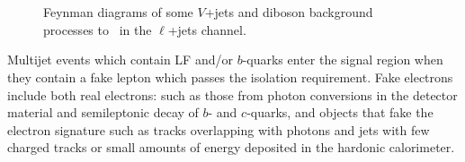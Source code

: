 \begin{figure}[htbp]
  \centering
    \begin{minipage}[][][t]{.32\textwidth}
      \centering
        
      \label{fig:WbbJets}
    \end{minipage}
    \,
    \begin{minipage}[][][t]{.32\textwidth}
      \centering
        
      \label{fig:ZbbJets}
    \end{minipage}
    
    \begin{minipage}[][][t]{.32\textwidth}
      \centering
        
      \label{fig:WW}
    \end{minipage}
    \,
    \begin{minipage}[][][t]{.32\textwidth}
      \centering
        
      \label{fig:SingleTop}
    \end{minipage}
    \caption{Feynman diagrams of some $V$+jets and diboson background processes to \ttbar\ in the $\ell$+jets channel.}
  \label{fig:CrossSectionWJetsFeynman}
\end{figure}

Multijet events which contain LF and/or $b$-quarks enter the signal region when they contain a fake lepton which passes the isolation requirement. Fake electrons include both real electrons: such as those from photon conversions in the detector material and semileptonic decay of $b$- and $c$-quarks, and objects that fake the electron signature such as tracks overlapping with photons and jets with few charged tracks or small amounts of energy deposited in the hardonic calorimeter. 

